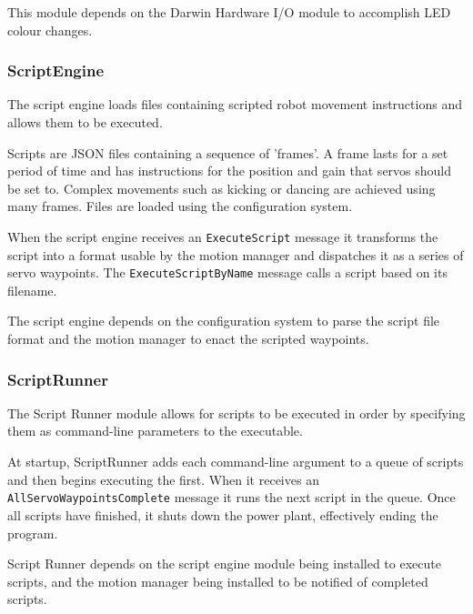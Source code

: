 \documentclass[english,12pt]{scrartcl}
\begin{document}
				This module depends on the Darwin Hardware I/O module to accomplish LED colour
				changes.
				
				
			\subsubsection{ScriptEngine}
				The script engine loads files containing scripted robot movement instructions and
				allows them to be executed.
				
				Scripts are JSON files containing a sequence of 'frames'. A frame lasts for a
				set period of time and has instructions for the position and gain that servos
				should be set to. Complex movements such as kicking or dancing are achieved
				using many frames. Files are loaded using the configuration system.
				
				When the script engine receives an \texttt{ExecuteScript} message it transforms
				the script into a format usable by the motion manager and dispatches it as a
				series of servo waypoints. The \texttt{ExecuteScriptByName} message calls a script
				based on its filename.
				
				The script engine depends on the configuration system to parse the script file
				format and the motion manager to enact the scripted waypoints.
			
				
			\subsubsection{ScriptRunner}
				The Script Runner module allows for scripts to be executed in order by specifying
				them as command-line parameters to the executable.
				
				At startup, ScriptRunner adds each command-line argument to a queue of scripts
				and then begins executing the first. When it receives an
				\texttt{AllServoWaypointsComplete} message it runs the next script in the queue.
				Once all scripts have finished, it shuts down the power plant, effectively ending
				the program.
				
				Script Runner depends on the script engine module being installed to execute
				scripts, and the motion manager being installed to be notified of completed
				scripts.
			
\end{document}
